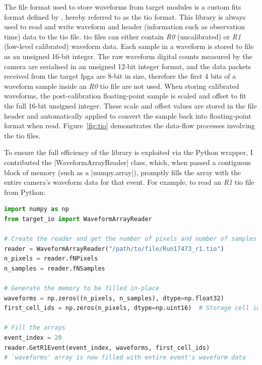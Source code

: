 The file format used to store waveforms from \gls{target} modules is a custom \gls{fits} format defined by , hereby referred to as the \gls{tio} format. This library is always used to read and write waveform and header (information such as observation time) data to the \gls{tio} file. \gls{tio} files can either contain \textit{R0} (uncalibrated)  or \textit{R1} (low-level calibrated) waveform data. Each sample in a waveform is stored to file as an unsigned 16-bit integer. The raw waveform digital counts measured by the camera are serialised in an unsigned 12-bit integer format, and the data packets received from the \gls{target} \gls{fpga} are 8-bit in size, therefore the first 4 bits of a waveform sample inside an \textit{R0} \gls{tio} file are not used. When storing calibrated waveforms, the post-calibration floating-point sample is scaled and offset to fit the full 16-bit unsigned integer. These scale and offset values are stored in the file header and automatically applied to convert the sample back into floating-point format when read. Figure~\ref{fig:tio} demonstrates the data-flow processes involving the \gls{tio} files.

To ensure the full efficiency of the \cpp library is exploited via the Python wrapper, I contributed the |WaveformArrayReader| class, which, when passed a contiguous block of memory (such as a \lstset{language=Python}|numpy.array|), promptly fills the array with the entire camera's waveform data for that event. For example, to read an \textit{R1} \gls{tio} file from Python:

\begin{lstlisting}[language=Python]
import numpy as np
from target_io import WaveformArrayReader

# Create the reader and get the number of pixels and number of samples from the header
reader = WaveformArrayReader("/path/to/file/Run17473_r1.tio")
n_pixels = reader.fNPixels
n_samples = reader.fNSamples

# Generate the memory to be filled in-place
waveforms = np.zeros((n_pixels, n_samples), dtype=np.float32)
first_cell_ids = np.zeros(n_pixels, dtype=np.uint16)  # Storage cell id for the first sample of the event per pixel

# Fill the arrays
event_index = 20
reader.GetR1Event(event_index, waveforms, first_cell_ids)
# `waveforms' array is now filled with entire event's waveform data
\end{lstlisting}

\subsection{}

